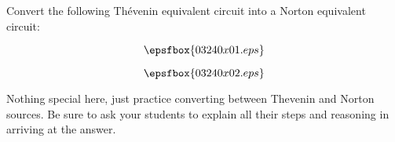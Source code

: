 

Convert the following Th\'evenin equivalent circuit into a Norton equivalent circuit:

$$\epsfbox{03240x01.eps}$$







$$\epsfbox{03240x02.eps}$$







Nothing special here, just practice converting between Thevenin and Norton sources.  Be sure to ask your students to explain all their steps and reasoning in arriving at the answer.




